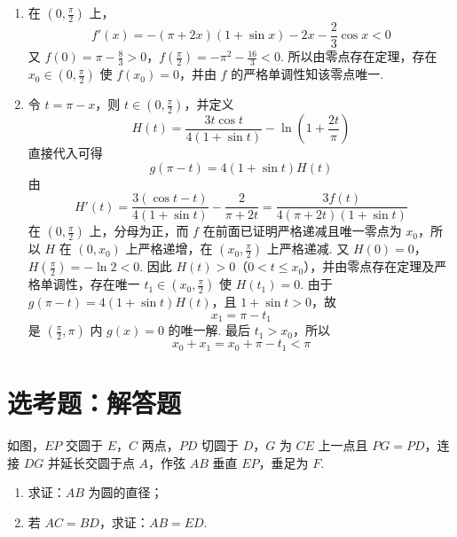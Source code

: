 \begin{solution}
\begin{enumerate}
\item
在 \(\left(0,\frac\pi2\right)\) 上，
\[
f'(x)=-(\pi+2x)(1+\sin x)-2x-\frac23\cos x<0
\]
又
\(f(0)=\pi-\frac83>0\)，\(f\left(\frac\pi2\right)=-\pi^2-\frac{16}{3}<0\).
所以由零点存在定理，存在 \(x_0\in\left(0,\frac\pi2\right)\) 使 \(f(x_0)=0\)，并由 \(f\) 的严格单调性知该零点唯一.

\item
令 \(t=\pi-x\)，则 \(t\in\left(0,\frac\pi2\right)\)，并定义
\[
H(t)=\frac{3t\cos t}{4(1+\sin t)}-\ln\left(1+\frac{2t}{\pi}\right)
\]
直接代入可得
\[
g(\pi-t)=4(1+\sin t)H(t)
\]
由
\[
H'(t)=\frac{3(\cos t-t)}{4(1+\sin t)}-\frac2{\pi+2t}
=\frac{3f(t)}{4(\pi+2t)(1+\sin t)}
\]
在 \(\left(0,\frac\pi2\right)\) 上，分母为正，而 \(f\) 在前面已证明严格递减且唯一零点为 \(x_0\)，所以 \(H\) 在 \(\left(0,x_0\right)\) 上严格递增，在 \(\left(x_0,\frac\pi2\right)\) 上严格递减. 又
\(H(0)=0\)，\(H\left(\frac\pi2\right)=-\ln2<0\).
因此 \(H(t)>0\)（\(0<t\leqslant x_0\)），并由零点存在定理及严格单调性，存在唯一
\(t_1\in\left(x_0,\frac\pi2\right)\) 使 \(H(t_1)=0\). 由于
\(g(\pi-t)=4(1+\sin t)H(t)\)，且 \(1+\sin t>0\)，故
\[
x_1=\pi-t_1
\]
是 \(\left(\frac\pi2,\pi\right)\) 内 \(g(x)=0\) 的唯一解. 最后 \(t_1>x_0\)，所以
\[
x_0+x_1=x_0+\pi-t_1<\pi
\]
\end{enumerate}
\end{solution}

\section{选考题：解答题}

\begin{problem}
如图，\(EP\) 交圆于 \(E\)，\(C\) 两点，\(PD\) 切圆于 \(D\)，\(G\) 为 \(CE\) 上一点且 \(PG = PD\)，连接 \(DG\) 并延长交圆于点 \(A\)，作弦 \(AB\) 垂直 \(EP\)，垂足为 \(F\).
\begin{enumerate}
\item 求证：\(AB\) 为圆的直径；
\item 若 \(AC = BD\)，求证：\(AB = ED\).
\end{enumerate}

\end{problem}

